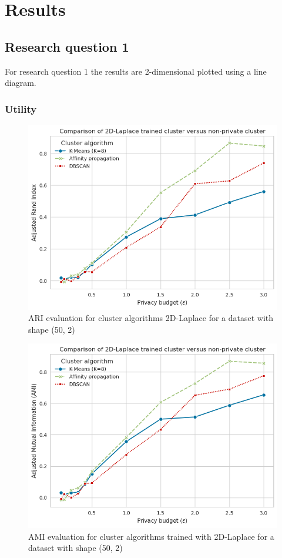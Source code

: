 \section{Results}
\subsection{Research question 1}
For research question 1 the results are 2-dimensional plotted using a line diagram.

\subsubsection{Utility}
\begin{figure}[!htb]
  \includegraphics[width=0.7\linewidth]{Results/ARI-epsilons.png}
  \caption{ARI evaluation for cluster algorithms 2D-Laplace for a dataset with shape (50, 2)}
\end{figure}
\begin{figure}[!htb]
  \includegraphics[width=0.7\linewidth]{Results/AMI-epsilons.png}
  \caption{AMI evaluation for cluster algorithms trained with 2D-Laplace for a dataset with shape (50, 2)}
\end{figure}
\newpage

